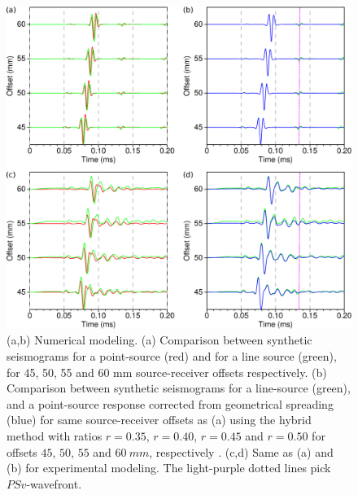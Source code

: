 \documentclass[manuscript,revised]{geophysics}
\begin{document}
\begin{figure}[!h]
	\centering
	\includegraphics[scale=0.5]{fig/trans2d3d.eps}
	\caption{(a,b) Numerical modeling. (a) Comparison between synthetic seismograms for a point-source (red) and for a line source (green), for 45, 50, 55 and 60 mm source-receiver offsets respectively. (b) Comparison between synthetic seismograms for a line-source (green), and a point-source response corrected from geometrical spreading (blue) for same source-receiver offsets as (a) using the hybrid method with ratios $r=0.35$, $r=0.40$, $r=0.45$ and $r=0.50$ for offsets $45$, $50$, $55$ and $60\ mm$, respectively . (c,d) Same as (a) and (b) for experimental modeling. The light-purple dotted lines pick $PSv$-wavefront.}%
	\label{panel_amplitude_sem}
\end{figure}

\end{document}
